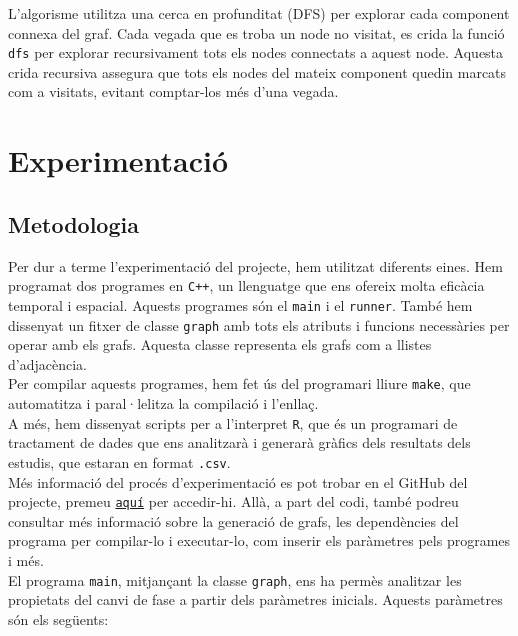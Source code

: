 \documentclass[a4paper]{article}
\begin{document}
	L'algorisme utilitza una cerca en profunditat (DFS) per explorar cada component connexa del graf. Cada vegada que es troba un node no visitat, es crida la funció \texttt{dfs} per explorar recursivament tots els nodes connectats a aquest node. Aquesta crida recursiva assegura que tots els nodes del mateix component quedin marcats com a visitats, evitant comptar-los més d'una vegada.

	\newpage
	\section{Experimentació}
	
	\subsection{Metodologia}
	\label{sec:metodologia}
	
	Per dur a terme l'experimentació del projecte, hem utilitzat diferents eines. Hem programat dos programes en \texttt{C++}, un llenguatge que ens ofereix molta eficàcia temporal i espacial. Aquests programes són el \texttt{main} i el \texttt{runner}. També hem dissenyat un fitxer de classe \texttt{graph} amb tots els atributs i funcions necessàries per operar amb els grafs. Aquesta classe representa els grafs com a llistes d'adjacència. \\
	
	Per compilar aquests programes, hem fet ús del programari lliure \texttt{make}, que automatitza i 
	paral·lelitza la compilació i l'enllaç. \\
	
	A més, hem dissenyat scripts per a l'interpret \texttt{R}, que és un programari de tractament de dades que ens analitzarà i generarà gràfics dels resultats dels estudis, que estaran en format \texttt{.csv}. \\
	
	Més informació del procés d'experimentació es pot trobar en el GitHub del projecte, premeu \href{https://github.com/Willyllem88/PercolationConnectivity}{\texttt{aquí}} per accedir-hi. Allà, a part del codi, també podreu consultar més informació sobre la generació de grafs, les dependències del programa per compilar-lo i executar-lo, com inserir els paràmetres pels programes i més. \\
	
	El programa \texttt{main}, mitjançant la classe \texttt{graph}, ens ha permès analitzar les propietats del canvi de fase a partir dels paràmetres inicials. Aquests paràmetres són els següents:
	
\end{document}
